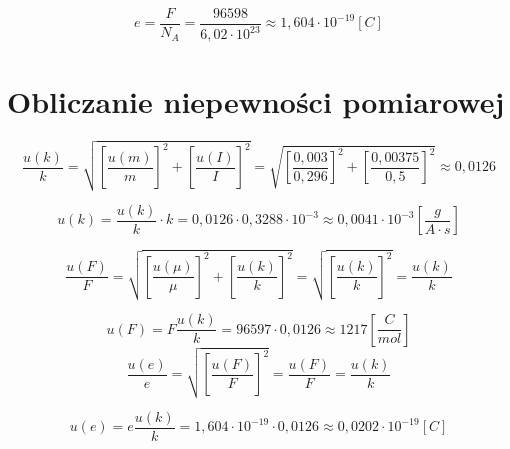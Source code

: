 \documentclass [a4paper,11pt]{article}
\begin{document}
 	\begin{equation}
 	e = \frac{F}{N_A} = \frac{96598 }{6,02 \cdot 10^{23}} \approx 1,604 \cdot 10^{-19}   \left[  C \right] 
 	\label{e_obliczone} 
 	\end{equation}
 	
 	\section{Obliczanie niepewności pomiarowej}
 	

 	

 	\begin{equation}
 	\frac{u(k)}{k} = \sqrt{\left[\frac{u(m)}{m} \right]^2 + \left[\frac{u(I)}{I} \right]^2 } = \sqrt{\left[\frac{ 0,003}{0,296} \right]^2 + \left[\frac{0,00375}{0,5} \right]^2 } \approx 0,0126
 	\end{equation}
 	
 	\begin{equation}
 	u(k) = \frac{u(k)}{k} \cdot k =  0,0126 \cdot 0,3288 \cdot 10^{-3} \approx 0,0041 \cdot 10^{-3}  \left[  \frac{g}{A \cdot s}\right] 
 	\end{equation}
 	

 	\begin{equation}
 	\frac{u(F)}{F} = \sqrt{\left[\frac{u(\mu)}{\mu} \right]^2 + \left[\frac{u(k)}{k} \right]^2 } = \sqrt{\left[\frac{u(k)}{k} \right]^2 } = \frac{u(k)}{k}  
 	\end{equation}
 	
 	\begin{equation}
 	u(F) = F \frac{u(k)}{k}  =  96597  \cdot  0,0126 \approx 1217  \left[  \frac{C}{mol}\right] 
 	\end{equation}
 	\begin{equation}
 	\frac{u(e)}{e}=\sqrt{\left[\frac{u(F)}{F}\right]^2} =  \frac{u(F)}{F} =  \frac{u(k)}{k}
 	\end{equation}
 	
 	\begin{equation}
 	u(e) = e \frac{u(k)}{k}  =  1,604 \cdot 10^{-19}  \cdot  0,0126 \approx 0,0202 \cdot 10^{-19} [C] 
 	\end{equation}
 	
	
\end{document}
